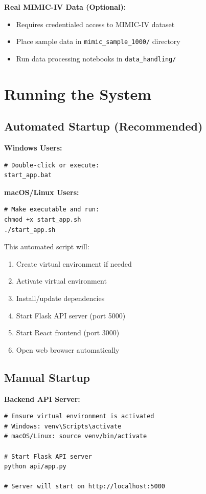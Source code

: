 \textbf{Real MIMIC-IV Data (Optional):}
\begin{itemize}
    \item Requires credentialed access to MIMIC-IV dataset
    \item Place sample data in \texttt{mimic\_sample\_1000/} directory
    \item Run data processing notebooks in \texttt{data\_handling/}
\end{itemize}

\section{Running the System}

\subsection{Automated Startup (Recommended)}

\textbf{Windows Users:}
\begin{verbatim}
# Double-click or execute:
start_app.bat
\end{verbatim}

\textbf{macOS/Linux Users:}
\begin{verbatim}
# Make executable and run:
chmod +x start_app.sh
./start_app.sh
\end{verbatim}

This automated script will:
\begin{enumerate}
    \item Create virtual environment if needed
    \item Activate virtual environment
    \item Install/update dependencies
    \item Start Flask API server (port 5000)
    \item Start React frontend (port 3000)
    \item Open web browser automatically
\end{enumerate}

\subsection{Manual Startup}

\textbf{Backend API Server:}
\begin{verbatim}
# Ensure virtual environment is activated
# Windows: venv\Scripts\activate
# macOS/Linux: source venv/bin/activate

# Start Flask API server
python api/app.py

# Server will start on http://localhost:5000
\end{verbatim}

